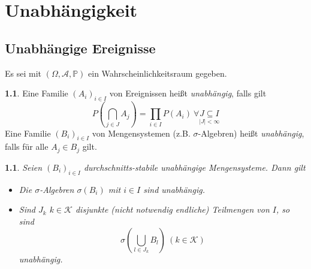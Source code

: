 \documentclass[10pt,a4paper]{report}
\numberwithin{equation}{section}
\numberwithin{figure}{section}
\theoremstyle{plain}
\theoremstyle{definition}
\newtheorem{defn}[thm]{\protect\definitionname}
\theoremstyle{remark}
\theoremstyle{plain}
\newtheorem{prop}[thm]{\protect\propositionname}
\providecommand{\definitionname}{Definition}
\providecommand{\propositionname}{Satz}
\newcommand{\1}{ \mathbb{1} } %
\begin{document}
\chapter{Unabhängigkeit}


\section{Unabhängige Ereignisse}
Es sei mit $\left(\Omega,\mathcal{A},\mathbb{P}\right)$ ein Wahrscheinlichkeitsraum
gegeben.
\begin{defn}   %
  Eine Familie $\left(A_{i}\right)_{i\in I}$ von Ereignissen heißt
  \emph{unabhängig}, falls gilt
  \begin{equation}
    P\left(\bigcap_{j\in J}A_{j}\right)=\prod_{i\in I}P\left(A_{i}\right)\ \forall\underset{\left|J\right|<\infty}{J\subseteq I}\label{eq:def1.1}
  \end{equation}
  Eine Familie $\left(B_{i}\right)_{i\in I}$ von Mengensystemen (z.B.
  $\sigma$-Algebren) heißt \emph{unabhängig}, falls für
  alle $A_{j}\in B_{j}$ gilt.
\end{defn}
\begin{prop}  %
  Seien $\left(B_{i}\right)_{i\in I}$ durchschnitts-stabile unabhängige
  Mengensysteme. Dann gilt
  \begin{itemize}
  \item [{(i)}] Die $\sigma$-Algebren $\sigma\left(B_{i}\right)$ mit $i\in I$
    sind unabhängig.
  \item [{(ii)}] Sind $J_{k}$ $k\in\mathcal{K}$ disjunkte (nicht notwendig
    endliche) Teilmengen von $I$, so sind
    \[
    \sigma\left(\bigcup_{l\in J_{k}}B_{l}\right)\ \left(k\in\mathcal{K}\right)
    \]
    unabhängig. \label{s1.2(ii)}
  \end{itemize}
\end{prop}
\end{document}
